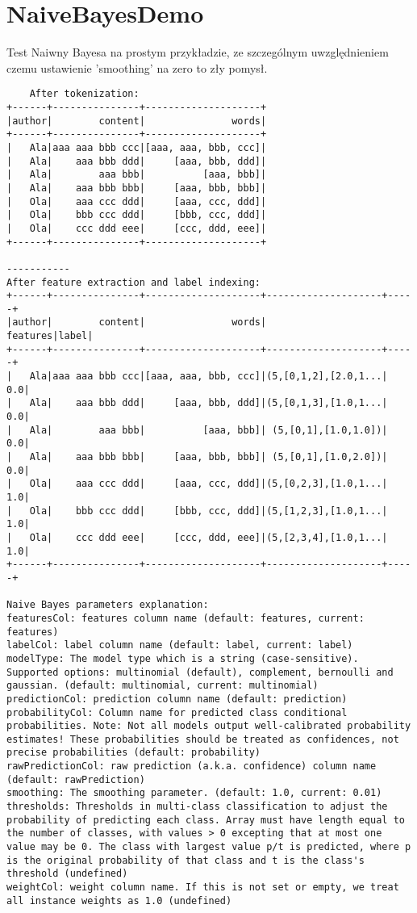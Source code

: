 \documentclass{article}
\begin{document}
\section{NaiveBayesDemo}
Test Naiwny Bayesa na prostym przykładzie, ze szczególnym uwzględnieniem czemu ustawienie 'smoothing' na zero to zły pomysł.
\begin{verbatim}
    After tokenization:
+------+---------------+--------------------+
|author|        content|               words|
+------+---------------+--------------------+
|   Ala|aaa aaa bbb ccc|[aaa, aaa, bbb, ccc]|
|   Ala|    aaa bbb ddd|     [aaa, bbb, ddd]|
|   Ala|        aaa bbb|          [aaa, bbb]|
|   Ala|    aaa bbb bbb|     [aaa, bbb, bbb]|
|   Ola|    aaa ccc ddd|     [aaa, ccc, ddd]|
|   Ola|    bbb ccc ddd|     [bbb, ccc, ddd]|
|   Ola|    ccc ddd eee|     [ccc, ddd, eee]|
+------+---------------+--------------------+

-----------
After feature extraction and label indexing:
+------+---------------+--------------------+--------------------+-----+
|author|        content|               words|            features|label|
+------+---------------+--------------------+--------------------+-----+
|   Ala|aaa aaa bbb ccc|[aaa, aaa, bbb, ccc]|(5,[0,1,2],[2.0,1...|  0.0|
|   Ala|    aaa bbb ddd|     [aaa, bbb, ddd]|(5,[0,1,3],[1.0,1...|  0.0|
|   Ala|        aaa bbb|          [aaa, bbb]| (5,[0,1],[1.0,1.0])|  0.0|
|   Ala|    aaa bbb bbb|     [aaa, bbb, bbb]| (5,[0,1],[1.0,2.0])|  0.0|
|   Ola|    aaa ccc ddd|     [aaa, ccc, ddd]|(5,[0,2,3],[1.0,1...|  1.0|
|   Ola|    bbb ccc ddd|     [bbb, ccc, ddd]|(5,[1,2,3],[1.0,1...|  1.0|
|   Ola|    ccc ddd eee|     [ccc, ddd, eee]|(5,[2,3,4],[1.0,1...|  1.0|
+------+---------------+--------------------+--------------------+-----+

Naive Bayes parameters explanation:
featuresCol: features column name (default: features, current: features)
labelCol: label column name (default: label, current: label)
modelType: The model type which is a string (case-sensitive). Supported options: multinomial (default), complement, bernoulli and gaussian. (default: multinomial, current: multinomial)
predictionCol: prediction column name (default: prediction)
probabilityCol: Column name for predicted class conditional probabilities. Note: Not all models output well-calibrated probability estimates! These probabilities should be treated as confidences, not precise probabilities (default: probability)
rawPredictionCol: raw prediction (a.k.a. confidence) column name (default: rawPrediction)
smoothing: The smoothing parameter. (default: 1.0, current: 0.01)
thresholds: Thresholds in multi-class classification to adjust the probability of predicting each class. Array must have length equal to the number of classes, with values > 0 excepting that at most one value may be 0. The class with largest value p/t is predicted, where p is the original probability of that class and t is the class's threshold (undefined)
weightCol: weight column name. If this is not set or empty, we treat all instance weights as 1.0 (undefined)


\end{verbatim}
\end{document}
